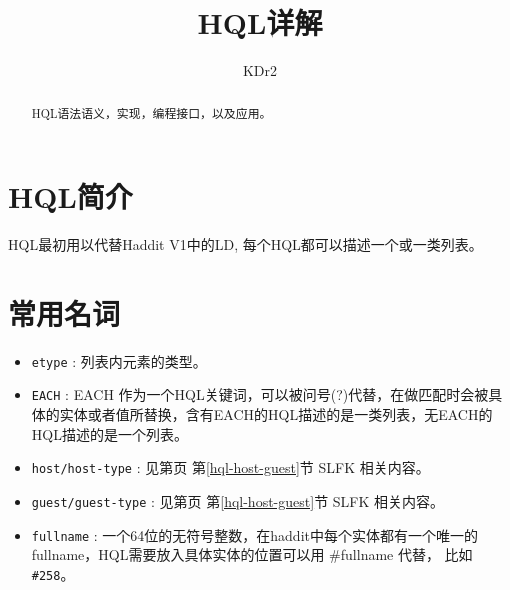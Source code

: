 \documentclass[10pt,a4paper]{article}
\author{KDr2}
\title{HQL详解}
\begin{document}
\begin{CJK}{UTF8}{gbsn}

  \maketitle{}
  \begin{abstract}
    HQL语法语义，实现，编程接口，以及应用。
  \end{abstract}
  \newpage

  \setcounter{tocdepth}{3}
  \tableofcontents
  \newpage
  \section{HQL简介}
  HQL最初用以代替Haddit V1中的LD, 每个HQL都可以描述一个或一类列表。
  \section{常用名词}

  \begin{itemize}
  \item \texttt{etype} : 列表内元素的类型。
  \item \texttt{EACH} : EACH 作为一个HQL关键词，可以被问号(?)代替，在做匹配时会被具体的实体或者值所替换，含有EACH的HQL描述的是一类列表，无EACH的HQL描述的是一个列表。
  \item \texttt{host/host-type} : 见第\pageref{hql-host-guest}页 第\ref{hql-host-guest}节 SLFK 相关内容。
  \item \texttt{guest/guest-type} : 见第\pageref{hql-host-guest}页 第\ref{hql-host-guest}节 SLFK 相关内容。
  \item \texttt{fullname} : 一个64位的无符号整数，在haddit中每个实体都有一个唯一的fullname，HQL需要放入具体实体的位置可以用 \#fullname 代替， 比如 \texttt{\#258}。
  \end{itemize}


\end{CJK}
\end{document}
